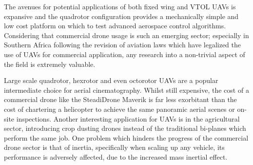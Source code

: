 The avenues for potential applications of both fixed wing and VTOL UAVs is expansive and the quadrotor configuration provides a mechanically simple and low cost platform on which to test advanced aerospace control algorithms. Considering that commercial drone usage is such an emerging sector; especially in Southern Africa following the revision of aviation laws \cite{safedrone} which have legalized the use of UAVs for commercial application, any research into a non-trivial aspect of the field is extremely valuable. 
\par
Large scale quadrotor, hexrotor and even octorotor UAVs are a popular intermediate choice for aerial cinematography.  Whilst still expensive, the cost of a commercial drone like the SteadiDrone Maverik \cite{steadidrone} is far less exorbitant than the cost of chartering a helicopter to achieve the same panoramic aerial scenes or on-site inspections. Another interesting application for UAVs is in the agricultural sector, introducing crop dusting drones instead of the traditional bi-planes which perform the same job. One problem which hinders the progress of the commercial drone sector is that of inertia, specifically when scaling up any vehicle, its performance is adversely affected, due to the increased mass inertial effect.
